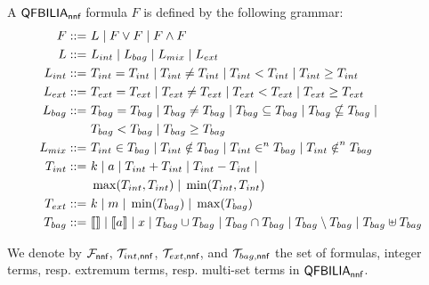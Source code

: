 \begin{mydef}
\label{def:nnf}
A $\textsf{QFBILIA}_{\textsf{nnf}}$ formula $F$ is defined by the following grammar:
\begin{align*}
F ::= &\ L \; | \; F\lor F \; | \; F\land F
\\
L ::= &\ L_{int} \; |\; L_{bag} \; |\; L_{mix} \; |\; L_{ext}
\\
L_{int} ::= &\ T_{int} = T_{int} \; |\; T_{int} \neq T_{int} \; |\; T_{int} < T_{int}\; |\; T_{int} \ge T_{int}
\\
L_{ext} ::= &\ T_{ext} = T_{ext} \; |\; T_{ext} \neq T_{ext} \; |\; T_{ext} < T_{ext}\; |\;  T_{ext} \ge T_{ext}
\\
L_{bag} ::= &\  T_{bag} = T_{bag} \; |\;T_{bag} \neq T_{bag} \; |\;T_{bag} \subseteq T_{bag} \; |\;T_{bag} \nsubseteq T_{bag} \; | \; \notag\\
&\ T_{bag} < T_{bag} \; |\;T_{bag} \ge T_{bag}
\\
L_{mix}  ::=  &\ T_{int} \in T_{bag}\; |\;T_{int} \notin T_{bag}\; |\;T_{int} \in^{n} T_{bag}\; |\;T_{int} \notin^{n} T_{bag}
\notag\\
T_{int} ::= &\  k \;|\; a \;|\; T_{int} + T_{int} \;|\; T_{int} - T_{int}\;|\;
\\
&\ \max(T_{int},T_{int})\;|\; \min(T_{int},T_{int})
\\
T_{ext} ::= &\ k \;|\; m \;|\; \min(T_{bag}) \;|\; \max(T_{bag})
\\
T_{bag} ::=  &\  \llbracket  \rrbracket\;|\;\llbracket a \rrbracket \;|\;x \;|\; T_{bag} \cup T_{bag} \;|\; T_{bag} \cap T_{bag}\;|\; T_{bag} \setminus T_{bag}\;|\; T_{bag} \uplus T_{bag}
\end{align*}

We denote by $\mathcal{F}_{\textsf{nnf}}$, $\mathcal{T}_{int,\textsf{nnf}}$, $\mathcal{T}_{ext,\textsf{nnf}}$, and $\mathcal{T}_{bag,\textsf{nnf}}$ the set of formulas, integer terms, resp. extremum terms, resp. multi-set terms  in $\textsf{QFBILIA}_{\textsf{nnf}}$.
\end{mydef}
